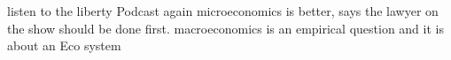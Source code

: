 listen to the liberty Podcast again
microeconomics is better, says the lawyer on the show should be done first.
macroeconomics is an empirical question and it is about an Eco system